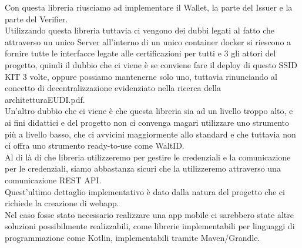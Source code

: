 Con questa libreria riusciamo ad implementare il Wallet, la parte del Issuer e la parte del Verifier.\\
Utilizzando questa libreria tuttavia ci vengono dei dubbi legati al fatto che attraverso un unico Server all'interno di un unico container docker si riescono a fornire tutte le 
interfacce legate alle certificazioni per tutti e 3 gli attori del progetto, quindi il dubbio che ci viene è se conviene fare il deploy di questo
SSID KIT 3 volte, oppure possiamo mantenerne solo uno, tuttavia rinunciando al concetto di decentralizzazione evidenziato nella ricerca
della architetturaEUDI.pdf.\\
Un'altro dubbio che ci viene è che questa libreria sia ad un livello troppo alto, e ai fini didattici e del progetto non ci convenga magari 
utilizzare uno strumento più a livello basso, che ci avvicini maggiormente allo standard e che tuttavia non ci offra uno strumento ready-to-use come WaltID.\\
Al di là di che libreria utilizzeremo per gestire le credenziali e la comunicazione per le credenziali, siamo abbastanza sicuri che la
utilizzeremo attraverso una comunicazione REST API.\\
Quest'ultimo dettaglio implementativo è dato dalla natura del progetto che ci richiede la creazione di webapp.\\
Nel caso fosse stato necessario realizzare
una app mobile ci sarebbero state altre soluzioni possibilmente realizzabili, come librerie implementabili per linguaggi di programmazione come Kotlin, implementabili tramite Maven/Grandle.\\

